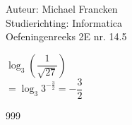 \documentclass[a4paper]{article}
\begin{document}
\noindent \large Auteur: Michael Francken \\
\noindent \large Studierichting: Informatica\\
\noindent \large Oefeningenreeks 2E nr. 14.5\\

\medskip

\normalsize

$\log_{3}\left(\dfrac{1}{\sqrt{27}}\right)$\\

$= \log_{3} 3^{-\tfrac{3}{2}} = -\dfrac{3}{2}$\\



\begin{thebibliography}{999}
\end{thebibliography}
\end{document}
